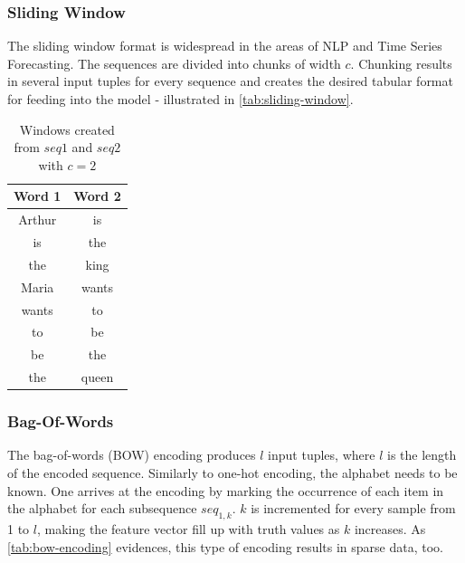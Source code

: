 \subsubsection*{Sliding Window}
The sliding window format is widespread in the areas of NLP and Time Series Forecasting. The sequences are divided into chunks of width $c$. Chunking results in several input tuples for every sequence and creates the desired tabular format for feeding into the model - illustrated in \autoref{tab:sliding-window}.

\begin{table}
    \centering
    \begin{tabular}{cc}
        Word 1 & Word 2\\
        \midrule
        Arthur & is\\
        is & the\\
        the & king\\
        Maria & wants\\
        wants & to\\
        to & be\\
        be & the\\
        the & queen
    \end{tabular}
    \caption{Windows created from $seq1$ and $seq2$ with $c=2$}
    \label{tab:sliding-window}
\end{table}

\subsubsection*{Bag-Of-Words}
The bag-of-words (BOW) encoding produces $l$ input tuples, where $l$ is the length of the encoded sequence. Similarly to one-hot encoding, the alphabet needs to be known. One arrives at the encoding by marking the occurrence of each item in the alphabet for each subsequence $seq_{1,k}$. $k$ is incremented for every sample from 1 to $l$, making the feature vector fill up with truth values as $k$ increases. As \autoref{tab:bow-encoding} evidences, this type of encoding results in sparse data, too.

